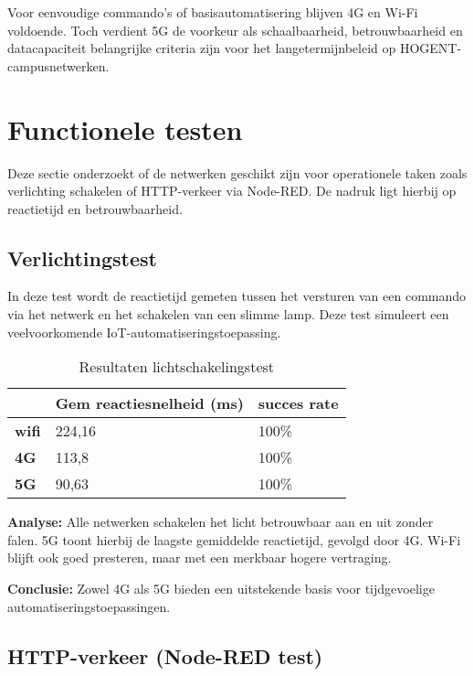 Voor eenvoudige commando's of basisautomatisering blijven 4G en Wi-Fi voldoende. Toch verdient 5G de voorkeur als schaalbaarheid, betrouwbaarheid en datacapaciteit belangrijke criteria zijn voor het langetermijnbeleid op HOGENT-campusnetwerken.


\newpage
\section{Functionele testen}

Deze sectie onderzoekt of de netwerken geschikt zijn voor operationele taken zoals verlichting schakelen of HTTP-verkeer via Node-RED. De nadruk ligt hierbij op reactietijd en betrouwbaarheid.

\subsection{Verlichtingstest}

In deze test wordt de reactietijd gemeten tussen het versturen van een commando via het netwerk en het schakelen van een slimme lamp. Deze test simuleert een veelvoorkomende IoT-automatiseringstoepassing.

\begin{table}[]
    \caption{Resultaten lichtschakelingstest}
    \begin{tabular}{l l l}
        \cline{2-3}
        & \textbf{Gem reactiesnelheid (ms)} & \textbf{succes rate} \\ \hline
        \multicolumn{1}{l}{\textbf{wifi}} & 224,16                            & 100\%                \\ \hline
        \multicolumn{1}{l}{\textbf{4G}}   & 113,8                             & 100\%                \\ \hline
        \multicolumn{1}{l}{\textbf{5G}}   & 90,63                             & 100\%                \\ \hline
    \end{tabular}
    \label{tab:licht}
\end{table}

\textbf{Analyse:} Alle netwerken schakelen het licht betrouwbaar aan en uit zonder falen. 5G toont hierbij de laagste gemiddelde reactietijd, gevolgd door 4G. Wi-Fi blijft ook goed presteren, maar met een merkbaar hogere vertraging.

\textbf{Conclusie:} Zowel 4G als 5G bieden een uitstekende basis voor tijdgevoelige automatiseringstoepassingen.

\subsection{HTTP-verkeer (Node-RED test)}

